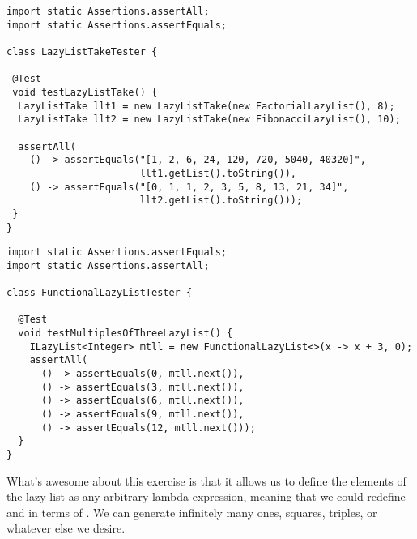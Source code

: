 

\begin{lstlisting}[language=MyJava]
import static Assertions.assertAll;
import static Assertions.assertEquals;

class LazyListTakeTester {

 @Test
 void testLazyListTake() {
  LazyListTake llt1 = new LazyListTake(new FactorialLazyList(), 8);
  LazyListTake llt2 = new LazyListTake(new FibonacciLazyList(), 10);

  assertAll(
    () -> assertEquals("[1, 2, 6, 24, 120, 720, 5040, 40320]",
                       llt1.getList().toString()),
    () -> assertEquals("[0, 1, 1, 2, 3, 5, 8, 13, 21, 34]",
                       llt2.getList().toString()));
 }
}
\end{lstlisting}


\begin{lstlisting}[language=MyJava]
import static Assertions.assertEquals;
import static Assertions.assertAll;

class FunctionalLazyListTester {

  @Test
  void testMultiplesOfThreeLazyList() {
    ILazyList<Integer> mtll = new FunctionalLazyList<>(x -> x + 3, 0);
    assertAll(
      () -> assertEquals(0, mtll.next()),
      () -> assertEquals(3, mtll.next()),
      () -> assertEquals(6, mtll.next()),
      () -> assertEquals(9, mtll.next()),
      () -> assertEquals(12, mtll.next()));
  }
}
\end{lstlisting}

What's awesome about this exercise is that it allows us to define the elements of the lazy list as any arbitrary lambda expression, meaning that we could redefine  and  in terms of . We can generate infinitely many ones, squares, triples, or whatever else we desire.

